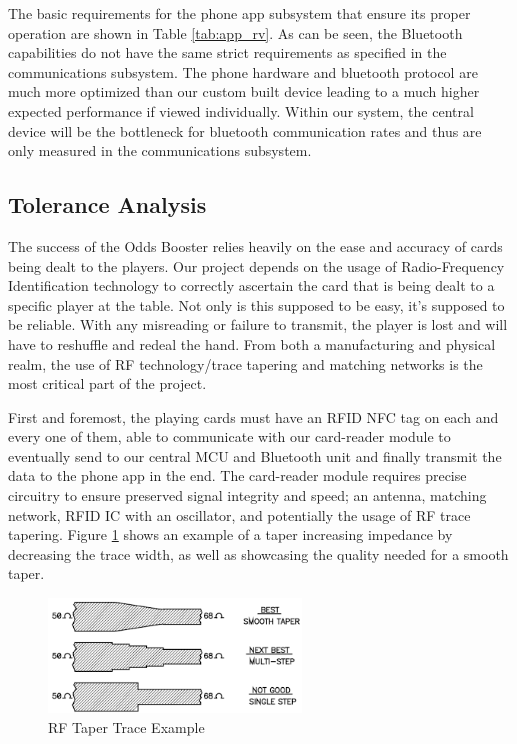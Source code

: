 \documentclass[12pt]{article}
\begin{document}
The basic requirements for the phone app subsystem that ensure its proper operation are shown in Table \ref{tab:app_rv}. As can be seen, the Bluetooth capabilities do not have the same strict requirements as specified in the communications subsystem. The phone hardware and bluetooth protocol are much more optimized than our custom built device leading to a much higher expected performance if viewed individually. Within our system, the central device will be the bottleneck for bluetooth communication rates and thus are only measured in the communications subsystem.

\subsection{Tolerance Analysis}

The success of the Odds Booster relies heavily on the ease and accuracy of cards being dealt to the players. Our project depends on the usage of Radio-Frequency Identification technology to correctly ascertain the card that is being dealt to a specific player at the table. Not only is this supposed to be easy, it's supposed to be reliable. With any misreading or failure to transmit, the player is lost and will have to reshuffle and redeal the hand. From both a manufacturing and physical realm, the use of RF technology/trace tapering and matching networks is the most critical part of the project.

First and foremost, the playing cards must have an RFID NFC tag on each and every one of them, able to communicate with our card-reader module to eventually send to our central MCU and Bluetooth unit and finally transmit the data to the phone app in the end. The card-reader module requires precise circuitry to ensure preserved signal integrity and speed; an antenna, matching network, RFID IC with an oscillator, and potentially the usage of RF trace tapering. Figure \ref{fig:taper} shows an example of a taper increasing impedance by decreasing the trace width, as well as showcasing the quality needed for a smooth taper.

\begin{figure}[!h]
	\centering
	\includegraphics[width=0.6\textwidth]{image6.png}
	\caption{RF Taper Trace Example}
	\label{fig:taper}
\end{figure}
\end{document}
